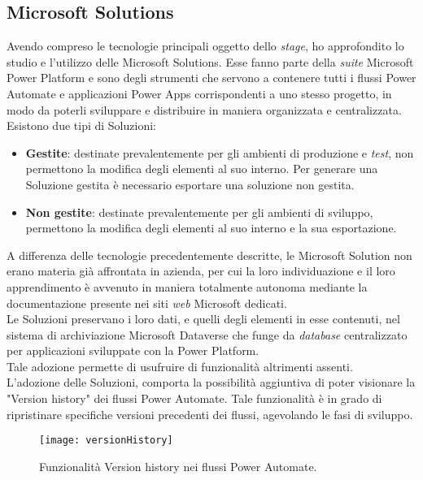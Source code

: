 \subsection{Microsoft Solutions}
Avendo compreso le tecnologie principali oggetto dello \emph{stage}, ho approfondito lo studio e l'utilizzo delle Microsoft Solutions.
Esse fanno parte della \emph{suite} Microsoft Power Platform e sono degli strumenti che servono a contenere tutti i flussi Power Automate e applicazioni Power Apps corrispondenti a uno stesso progetto, in modo da poterli sviluppare e distribuire in maniera organizzata e centralizzata.\\
Esistono due tipi di Soluzioni: 
\begin{itemize}
    \item \textbf{Gestite}: destinate prevalentemente per gli ambienti di produzione e \emph{test}, non permettono la modifica degli elementi al suo interno. Per generare una Soluzione gestita è necessario esportare una soluzione non gestita.
    \item \textbf{Non gestite}: destinate prevalentemente per gli ambienti di sviluppo, permettono la modifica degli elementi al suo interno e la sua esportazione.
\end{itemize}
A differenza delle tecnologie precedentemente descritte, le Microsoft Solution non erano materia già affrontata in azienda, per cui la loro individuazione e il loro apprendimento è avvenuto in maniera totalmente autonoma mediante la documentazione presente nei siti \emph{web} Microsoft dedicati.\\
Le Soluzioni preservano i loro dati, e quelli degli elementi in esse contenuti, nel sistema di archiviazione Microsoft Dataverse che funge da \emph{database} centralizzato per applicazioni sviluppate con la Power Platform.\\
Tale adozione permette di usufruire di funzionalità altrimenti assenti.\\
L'adozione delle Soluzioni, comporta la possibilità aggiuntiva di poter visionare la "Version history" dei flussi Power Automate. Tale funzionalità è in grado di ripristinare specifiche versioni precedenti dei flussi, agevolando le fasi di sviluppo.
\begin{figure}[htbp] 
    \centering 
    \texttt{[image: versionHistory]} 
    \caption{Funzionalità Version history nei flussi Power Automate.}
    \label{fig:versionHistory}
\end{figure}

